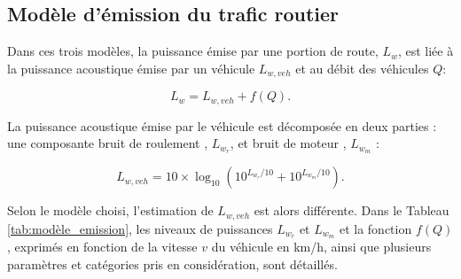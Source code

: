 \subsection{Modèle d'émission du trafic routier}\label{part:modele_emission}

Dans ces trois modèles, la puissance émise par une portion de route, $L_w$, est liée à la puissance acoustique émise par un véhicule $L_{w,veh}$ et au débit des véhicules $Q$:

\begin{equation}
L_w = L_{w,veh} + f(Q).
\end{equation}

La puissance acoustique émise par le véhicule est décomposée en deux parties : une composante \og bruit de roulement \fg{}, $L_{w_r}$, et \og bruit de moteur \fg{}, $L_{w_m}$ :

\begin{equation}
L_{w,veh} = 10\times \log_{10} \left(10^{L_{w_r}/10}+10^{L_{w_m}/10}\right).
\end{equation}

Selon le modèle choisi, l'estimation de $L_{w,veh}$ est alors différente. Dans le Tableau \ref{tab:modèle_emission}, les niveaux de puissances $L_{w_r}$ et $L_{w_m}$ et la fonction $f(Q)$, exprimés en fonction de la vitesse $v$ du véhicule en km/h, ainsi que plusieurs paramètres et catégories pris en considération, sont détaillés.

